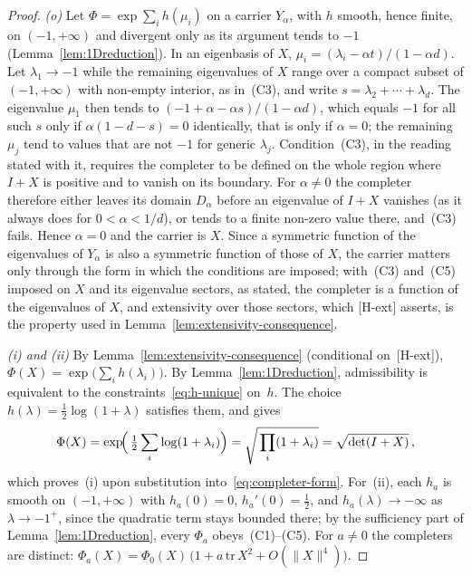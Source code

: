 \documentclass[pdflatex,sn-mathphys-num]{sn-jnl} %
\theoremstyle{remark}
\theoremstyle{plain}
\begin{document}
    \begin{proof}
      \textit{(o)}\;
      Let $\Phi = \exp\sum_i h(\mu_i)$ on a carrier $Y_\alpha$, with $h$ smooth, hence finite, on $(-1, +\infty)$
      and divergent only as its argument tends to $-1$ (Lemma~\ref{lem:1Dreduction}).
      In an eigenbasis of $X$, $\mu_i = (\lambda_i - \alpha t)/(1 - \alpha d)$.
      Let $\lambda_1 \to -1$ while the remaining eigenvalues of $X$ range over a compact subset of $(-1, +\infty)$
      with non-empty interior, as in~(C3), and write $s = \lambda_2 + \cdots + \lambda_d$.
      The eigenvalue $\mu_1$ then tends to $(-1 + \alpha - \alpha s)/(1 - \alpha d)$, which equals $-1$ for all such
      $s$ only if $\alpha(1 - d - s) = 0$ identically, that is only if $\alpha = 0$; the remaining $\mu_j$ tend to
      values that are not $-1$ for generic $\lambda_j$.
      Condition~(C3), in the reading stated with it, requires the completer to be defined on the whole region
      where $I + X$ is positive and to vanish on its boundary.
      For $\alpha \neq 0$ the completer therefore either leaves its domain $D_\alpha$ before an eigenvalue of $I + X$
      vanishes (as it always does for $0 < \alpha < 1/d$), or tends to a finite non-zero value there, and~(C3)
      fails.
      Hence $\alpha = 0$ and the carrier is $X$.
      Since a symmetric function of the eigenvalues of $Y_\alpha$ is also a symmetric function of those of $X$, the
      carrier matters only through the form in which the conditions are imposed; with~(C3) and~(C5) imposed on $X$
      and its eigenvalue sectors, as stated, the completer is a function of the eigenvalues of $X$, and extensivity
      over those sectors, which [H-ext] asserts, is the property used in
      Lemma~\ref{lem:extensivity-consequence}.

      \textit{(i) and (ii)}\;
      By Lemma~\ref{lem:extensivity-consequence}
      (conditional on~[H-ext]),
      $\Phi(X) = \exp\!\bigl(\sum_i h(\lambda_i)\bigr)$.
      By Lemma~\ref{lem:1Dreduction}, admissibility is
      equivalent to the constraints~\eqref{eq:h-unique}
      on~$h$.
      The choice $h(\lambda) = \tfrac12\log(1+\lambda)$
      satisfies them, and gives
      \[
        \Phi(X)
        = \exp\!\Bigl(\,
        \tfrac{1}{2}\sum_i \log(1 + \lambda_i)
        \Bigr)
        = \sqrt{\,\prod_i (1 + \lambda_i)}
        = \sqrt{\det(I + X)}\,,
      \]
      which proves~(i) upon substitution
      into~\eqref{eq:completer-form}.
      For~(ii), each $h_a$ is smooth on $(-1,+\infty)$ with
      $h_a(0) = 0$, $h_a'(0) = \tfrac12$, and
      $h_a(\lambda) \to -\infty$ as $\lambda \to -1^{+}$,
      since the quadratic term stays bounded there; by the
      sufficiency part of Lemma~\ref{lem:1Dreduction},
      every $\Phi_a$ obeys~(C1)--(C5).
      For $a \neq 0$ the completers are distinct:
      $\Phi_a(X)
      = \Phi_0(X)\,
      \bigl(1 + a\,\mathrm{tr}\,X^2 + O(\|X\|^4)\bigr)$.
    \end{proof}
\end{document}
